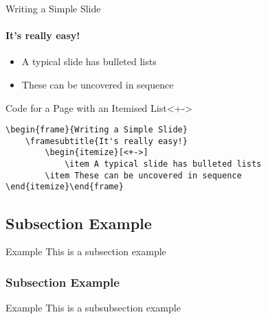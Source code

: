 \begin{frame}[fragile]{Writing a Simple Slide}
\framesubtitle{It's really easy!}
\begin{itemize}[<+->]
    \item A typical slide has bulleted lists
    \item These can be uncovered in sequence
\end{itemize}
\begin{block}{Code for a Page with an Itemised List}<+->
\begin{verbatim}
\begin{frame}{Writing a Simple Slide}
    \framesubtitle{It's really easy!}
        \begin{itemize}[<+->]
            \item A typical slide has bulleted lists
        \item These can be uncovered in sequence
\end{itemize}\end{frame}
\end{verbatim}
\end{block}

\end{frame}

\subsection{Subsection Example}

\begin{frame}{Example}
    This is a subsection example
    
\end{frame}

\subsubsection{Subsection Example}

\begin{frame}{Example}
    This is a subsubsection example
    
\end{frame}

